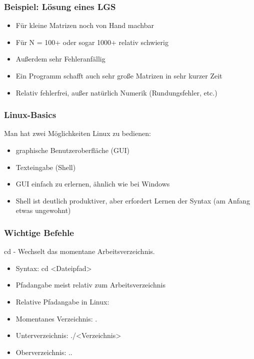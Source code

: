 \documentclass[ignorenonframetext,12pt]{beamer}
\theoremstyle{definition}
\theoremstyle{definition}
\begin{document}
\begin{frame}[fragile]
\frametitle{Beispiel: Lösung eines LGS}
\begin{itemize}
\item Für kleine Matrizen noch von Hand machbar
\item Für N = 100+ oder sogar 1000+ relativ schwierig
\item Au\ss erdem sehr Fehleranfällig
\item Ein Programm schafft auch sehr gro\ss e Matrizen in sehr kurzer Zeit
\item Relativ fehlerfrei, au\ss er natürlich Numerik (Rundungsfehler, etc.)
\end{itemize}
\end{frame}


\begin{frame}[fragile]
\frametitle{Linux-Basics}
Man hat zwei Möglichkeiten Linux zu bedienen:
\begin{itemize}
\item graphische Benutzeroberfläche (GUI)
\item Texteingabe (Shell)
\item GUI einfach zu erlernen, ähnlich wie bei Windows
\item Shell ist deutlich produktiver, aber erfordert Lernen der Syntax (am Anfang etwas ungewohnt)
\end{itemize}
\end{frame}


\begin{frame}[fragile]
\frametitle{Wichtige Befehle}
cd - Wechselt das momentane Arbeitsverzeichnis.
\begin{itemize}
\item Syntax: cd <Dateipfad>
\item Pfadangabe meist relativ zum Arbeitsverzeichnis
\item Relative Pfadangabe in Linux:
\item Momentanes Verzeichnis: .
\item Unterverzeichnis: ./<Verzeichnis>
\item Oberverzeichnis: ..
\end{itemize}
\end{frame}

\end{document}
